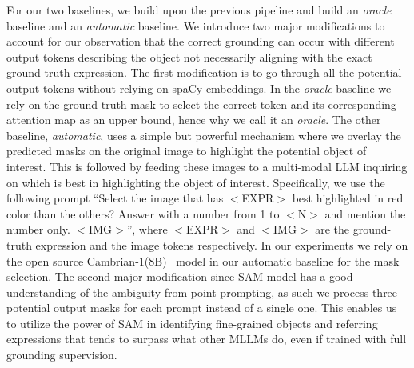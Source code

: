 For our two baselines, we build upon the previous pipeline and build an \textit{oracle} baseline and an \textit{automatic} baseline. We introduce two major modifications to account for our observation that the correct grounding can occur with different output tokens describing the object not necessarily aligning with the exact ground-truth expression. The first modification is to go through all the potential output tokens without relying on spaCy embeddings. In the \textit{oracle} baseline we rely on the ground-truth mask to select the correct token and its corresponding attention map as an upper bound, hence why we call it an \textit{oracle}. The other baseline, \textit{automatic}, uses a simple but powerful mechanism where we overlay the predicted masks on the original image to highlight the potential object of interest. This is followed by feeding these images to a multi-modal LLM inquiring on which is best in highlighting the object of interest. Specifically, we use the following prompt ``Select the image that has $<$EXPR$>$ best highlighted in red color than the others? Answer with a number from 1 to $<$N$>$ and mention the number only. $<$IMG$>$'', where  $<$EXPR$>$ and $<$IMG$>$ are the ground-truth expression and the image tokens respectively. In our experiments we rely on the open source Cambrian-1(8B)~\cite{tong2024cambrian} model in our automatic baseline for the mask selection. The second major modification since SAM model has a good understanding of the ambiguity from point prompting, as such we process three potential output masks for each prompt instead of a single one. This enables us to utilize the power of SAM in identifying fine-grained objects and referring expressions that tends to surpass what other MLLMs do, even if trained with full grounding supervision. %


